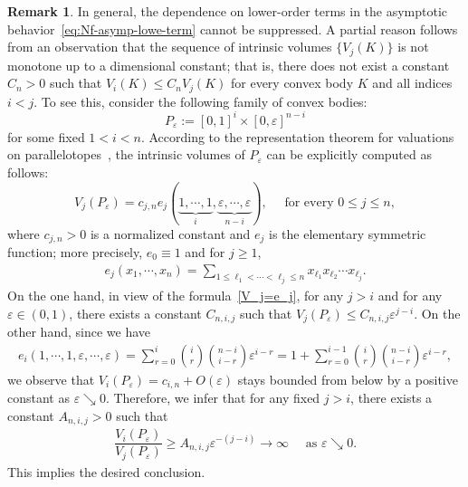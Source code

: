\documentclass[11pt]{article}
\theoremstyle{definition}
\numberwithin{equation}{section}
\newtheorem{remark}[theorem]{Remark}
\begin{document}
\begin{remark}
In general, the dependence on lower-order terms in the asymptotic behavior~\eqref{eq:Nf-asymp-lowe-term} cannot be suppressed. 
A partial reason follows from an observation that the sequence of intrinsic volumes \( \{ V_j(K) \} \) is not monotone up to a dimensional constant; that is, there does not exist a constant \( C_n > 0 \) such that $V_i(K) \leq C_n V_j(K)$ for every convex body \( K \) and all indices \( i < j \). 
To see this, consider the following family of convex bodies:
\[ P_\varepsilon := [0,1]^i \times [0,\varepsilon]^{n - i} 
\]
for some fixed \( 1 < i < n \). 
According to the representation theorem for valuations on parallelotopes~\cite[Theorem 4.2.1--4.2.2]{KR_1997}, the intrinsic volumes of \( P_\varepsilon \) can be explicitly computed as follows:
\begin{equation}\label{V_j=e_j}
    V_j(P_\varepsilon) = c_{j, n} e_j(\underbrace{1, \cdots, 1}_{i}, \underbrace{\varepsilon, \cdots, \varepsilon}_{n - i}), \quad \text{ for every } 0 \leq j \leq n,
\end{equation}
where $c_{j, n} > 0$ is a normalized constant and $e_j$ is the elementary symmetric function; more precisely, $e_0 \equiv 1$ and for $j \geq 1$,
\begin{align*}
    e_j(x_1, \cdots, x_n) = \sum_{1 \leq \ell_1 < \cdots < \ell_j \leq n} x_{\ell_1}x_{\ell_2} \cdots x_{\ell_j}.
\end{align*}
On the one hand, in view of the formula~\eqref{V_j=e_j}, for any $j > i$ and for any $\varepsilon \in (0, 1)$, there exists a constant $C_{n, i, j}$ such that $V_j(P_\varepsilon) \leq C_{n, i, j} \varepsilon^{j - i}$.
On the other hand, since we have
\begin{align*}
    e_i(1, \cdots, 1, \varepsilon, \cdots, \varepsilon) = \sum_{r = 0}^i {i \choose r}{n - i \choose i - r} \varepsilon^{i - r} = 1 + \sum_{r = 0}^{i - 1} {i \choose r}{n - i \choose i - r} \varepsilon^{i - r},
\end{align*}
we observe that $V_i(P_\varepsilon) = c_{i, n} + O(\varepsilon)$ stays bounded from below by a positive constant as $\varepsilon \searrow 0$.
Therefore, we infer that for any fixed $j > i$, there exists a constant $A_{n, i, j} > 0$ such that
\begin{align*}
    \dfrac{V_i(P_\varepsilon)}{V_j(P_\varepsilon)} \geq A_{n, i, j} \varepsilon^{-(j - i)} \to \infty \quad \text{ as } \varepsilon \searrow 0.  
\end{align*}
This implies the desired conclusion.
\end{remark}
\end{document}
